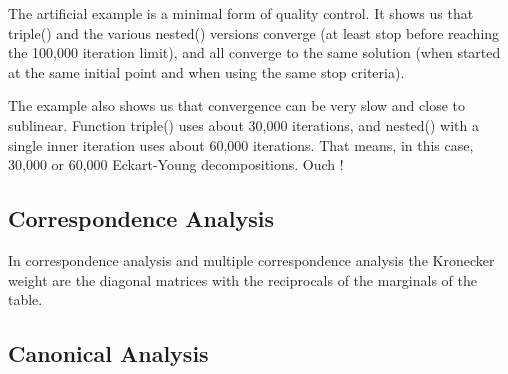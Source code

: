 \documentclass[
  12pt,
  letterpaper,
  DIV=11,
  numbers=noendperiod]{scrartcl}
\newenvironment{Shaded}{\begin{snugshade}}{\end{snugshade}}
\newcommand{\AttributeTok}[1]{\textcolor[rgb]{0.40,0.45,0.13}{#1}}
\newcommand{\CommentTok}[1]{\textcolor[rgb]{0.37,0.37,0.37}{#1}}
\newcommand{\ConstantTok}[1]{\textcolor[rgb]{0.56,0.35,0.01}{#1}}
\newcommand{\DecValTok}[1]{\textcolor[rgb]{0.68,0.00,0.00}{#1}}
\newcommand{\FunctionTok}[1]{\textcolor[rgb]{0.28,0.35,0.67}{#1}}
\newcommand{\NormalTok}[1]{\textcolor[rgb]{0.00,0.23,0.31}{#1}}
\newcommand{\OtherTok}[1]{\textcolor[rgb]{0.00,0.23,0.31}{#1}}
\newcommand{\SpecialCharTok}[1]{\textcolor[rgb]{0.37,0.37,0.37}{#1}}
\begin{document}
The artificial example is a minimal form of quality control. It shows us
that triple() and the various nested() versions converge (at least stop
before reaching the 100,000 iteration limit), and all converge to the
same solution (when started at the same initial point and when using the
same stop criteria).

The example also shows us that convergence can be very slow and close to
sublinear. Function triple() uses about 30,000 iterations, and nested()
with a single inner iteration uses about 60,000 iterations. That means,
in this case, 30,000 or 60,000 Eckart-Young decompositions. Ouch !

\subsection{Correspondence Analysis}\label{correspondence-analysis}

In correspondence analysis and multiple correspondence analysis the
Kronecker weight are the diagonal matrices with the reciprocals of the
marginals of the table.

\begin{Shaded}
\end{Shaded}

\subsection{Canonical Analysis}\label{canonical-analysis}
\end{document}
